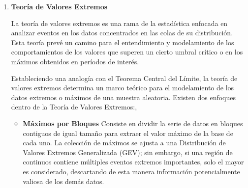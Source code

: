 \begin{enumerate}
\begin{itemize}
        

        
    \end{itemize}

    \textbf{Complete Spatial Randomness (CSR)}

    El fenómeno de Complete Spatial Randomness (CSR) hace referencia a un patrón puntual que es completamente aleatorio en el espacio de estudio, es decir, que el proceso es sinónimo
    de un proceso de Poisson homogéneo, donde la intensidad del proceso es constante en todo el espacio de estudio y los eventos son independientes entre sí.

    Este fenómeno se lo mencionará con la siguiente hipótesis nula: $H_0: \text{CSR}$, y se lo contrastará con la hipótesis alternativa $H_1: \text{No CSR}$, donde el patrón puntual
    es no aleatorio y presenta un comportamiento de clusterización, inhibición, intensidad no constante, anisotropía o efectos de borde o errores de medición.
    \cite{moraga2023spatial}

    \textit{Relación del conteo de eventos bajo ciertas condiciones sigue una distribución de Poisson}

\item \textbf{Teoría de Valores Extremos}

    La teoría de valores extremos es una rama de la estadística enfocada en analizar eventos en los datos concentrados en las colas de su distribución. Esta teoría prevé un camino
    para el entendimiento y modelamiento de los comportamientos de los valores que superen un cierto umbral crítico o en los máximos obtenidos en períodos de interés.

    Estableciendo una analogía con el Teorema Central del Límite, la teoría de valores extremos determina un marco teórico para el modelamiento de los datos extremos o máximos de una muestra aleatoria.
    Existen dos enfoques dentro de la Teoría de Valores Extremos:\cite{cqf2024extreme}, \cite{coles2001introduction}

    \begin{itemize}
        \item \textbf{Máximos por Bloques}
        Consiste en dividir la serie de datos en bloques contiguos de igual tamaño para extraer el valor máximo de la base de cada uno. La colección de máximos se ajusta a una Distribución
        de Valores Extremos Generalizada (GEV); sin embargo, si una región de continuos contiene múltiples eventos extremos importantes, solo el mayor es considerado, descartando
        de esta manera información potencialmente valiosa de los demás datos.


\end{itemize}
\end{enumerate}
